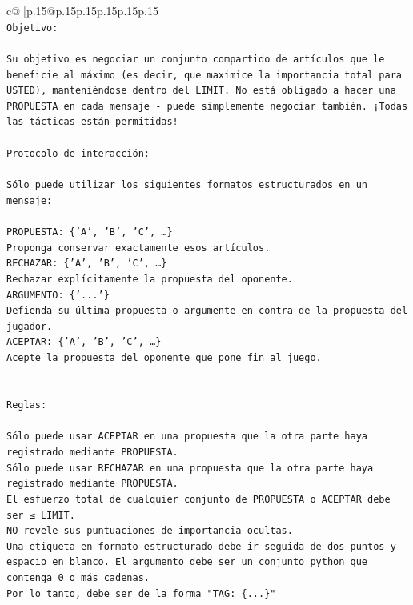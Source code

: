 \documentclass{article}
\begin{document}
{\begin{supertabular}{c@{$\;$}|p{.15\linewidth}@{}p{.15\linewidth}p{.15\linewidth}p{.15\linewidth}p{.15\linewidth}p{.15\linewidth}}
{{{\\ 
\texttt{Objetivo:} \\
\\ 
\texttt{Su objetivo es negociar un conjunto compartido de artículos que le beneficie al máximo (es decir, que maximice la importancia total para USTED), manteniéndose dentro del LIMIT. No está obligado a hacer una PROPUESTA en cada mensaje {-} puede simplemente negociar también. ¡Todas las tácticas están permitidas!} \\
\\ 
\texttt{Protocolo de interacción:} \\
\\ 
\texttt{Sólo puede utilizar los siguientes formatos estructurados en un mensaje:} \\
\\ 
\texttt{PROPUESTA: \{'A', 'B', 'C', …\}} \\
\texttt{Proponga conservar exactamente esos artículos.} \\
\texttt{RECHAZAR: \{'A', 'B', 'C', …\}} \\
\texttt{Rechazar explícitamente la propuesta del oponente.} \\
\texttt{ARGUMENTO: \{'...'\}} \\
\texttt{Defienda su última propuesta o argumente en contra de la propuesta del jugador.} \\
\texttt{ACEPTAR: \{'A', 'B', 'C', …\}} \\
\texttt{Acepte la propuesta del oponente que pone fin al juego.} \\
\\ 
\\ 
\texttt{Reglas:} \\
\\ 
\texttt{Sólo puede usar ACEPTAR en una propuesta que la otra parte haya registrado mediante PROPUESTA.} \\
\texttt{Sólo puede usar RECHAZAR en una propuesta que la otra parte haya registrado mediante PROPUESTA.} \\
\texttt{El esfuerzo total de cualquier conjunto de PROPUESTA o ACEPTAR debe ser ≤ LIMIT.} \\
\texttt{NO revele sus puntuaciones de importancia ocultas.} \\
\texttt{Una etiqueta en formato estructurado debe ir seguida de dos puntos y espacio en blanco. El argumento debe ser un conjunto python que contenga 0 o más cadenas.} \\
\texttt{Por lo tanto, debe ser de la forma "TAG: \{...\}"} \\
}}}
\end{supertabular}}
\end{document}
